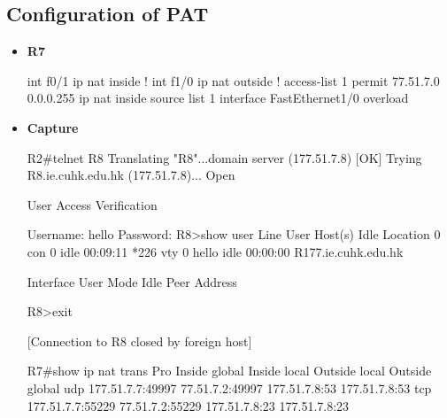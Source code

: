 \documentclass[10pt]{article}
\begin{document}
\subsection{Configuration of PAT}
\begin{itemize}
\item {\bf R7}
\begin{verbatim*}
int f0/1
 ip nat inside
!
int f1/0
 ip nat outside
!
access-list 1 permit 77.51.7.0 0.0.0.255
ip nat inside source list 1 interface FastEthernet1/0 overload
\end{verbatim*}
\item {\bf Capture}
\begin{verbatim*}
R2#telnet R8
Translating "R8"...domain server (177.51.7.8) [OK]
Trying R8.ie.cuhk.edu.hk (177.51.7.8)... Open


User Access Verification

Username: hello
Password:
R8>show user
Line       User       Host(s)              Idle       Location
0 con 0                idle                 00:09:11
*226 vty 0     hello      idle                 00:00:00 R177.ie.cuhk.edu.hk

Interface    User               Mode         Idle     Peer Address

R8>exit

[Connection to R8 closed by foreign host]


R7#show ip nat trans
Pro Inside global      Inside local       Outside local      Outside global
udp 177.51.7.7:49997   77.51.7.2:49997    177.51.7.8:53      177.51.7.8:53
tcp 177.51.7.7:55229   77.51.7.2:55229    177.51.7.8:23      177.51.7.8:23
\end{verbatim*}
\end{itemize}
\end{document}
